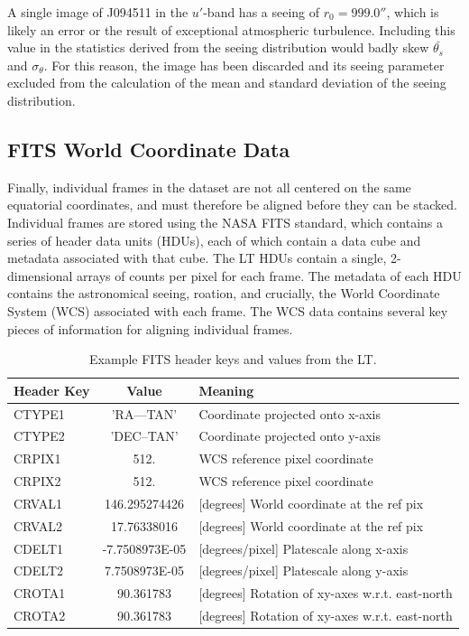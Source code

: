 \documentclass[a4paper,11pt]{article}
\begin{document}
A single image of J094511 in the $u'$-band has a seeing of $r_0=999.0''$, which is likely an error or the result of exceptional atmospheric turbulence. Including this value in the statistics derived from the seeing distribution would badly skew $\bar{\theta_s}$ and $\sigma_\theta$. For this reason, the image has been discarded and its seeing parameter excluded from the calculation of the mean and standard deviation of the seeing distribution.

\subsection{FITS World Coordinate Data}

Finally, individual frames in the dataset are not all centered on the same equatorial coordinates, and must therefore be aligned before they can be stacked. Individual frames are stored using the NASA FITS standard, which contains a series of header data units (HDUs), each of which contain a data cube and metadata associated with that cube.\cite{FITS_standard} The LT HDUs contain a single, 2-dimensional arrays of counts per pixel for each frame. The metadata of each HDU contains the astronomical seeing, roation, and crucially, the World Coordinate System (WCS) associated with each frame.\cite{greisen_2002} The WCS data contains several key pieces of information for aligning individual frames.

\begin{table}[h!]
    \centering
    \begin{tabular}{ | l | c | l |} \hline
        Header Key & Value & Meaning \\ \hline \hline
        CTYPE1  & 'RA---TAN'     & Coordinate projected onto x-axis \\
        CTYPE2  & 'DEC--TAN'     & Coordinate projected onto y-axis \\
        CRPIX1  &  512.          & WCS reference pixel coordinate \\
        CRPIX2  &  512.          & WCS reference pixel coordinate \\
        CRVAL1  &  146.295274426 & [degrees] World coordinate at the ref pix \\
        CRVAL2  &  17.76338016   & [degrees] World coordinate at the ref pix \\
        CDELT1  & -7.7508973E-05 & [degrees/pixel] Platescale along x-axis \\
        CDELT2  & 7.7508973E-05  & [degrees/pixel] Platescale along y-axis \\
        CROTA1  & 90.361783      & [degrees] Rotation of xy-axes w.r.t. east-north \\
        CROTA2  & 90.361783      & [degrees] Rotation of xy-axes w.r.t. east-north \\ \hline
    \end{tabular}
    \caption{\label{tab:FITS_header}Example FITS header keys and values from the LT.}
\end{table}
\end{document}
